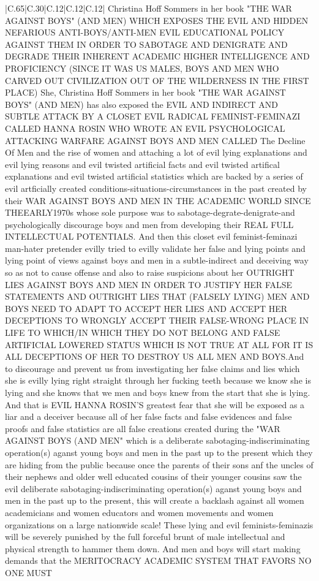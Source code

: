 \documentclass[11pt]{article}
\newlength\mylength
\begin{document}
\begin{center}
\begin{longtable}{|C{.65\mylength}|C{.30\mylength}|C{.12\mylength}|C{.12\mylength}|C{.12\mylength}|}
Christina Hoff Sommers in her book "THE WAR AGAINST BOYS" (AND MEN) WHICH EXPOSES THE EVIL AND HIDDEN NEFARIOUS ANTI-BOYS/ANTI-MEN EVIL EDUCATIONAL POLICY AGAINST THEM IN ORDER TO SABOTAGE AND DENIGRATE AND DEGRADE THEIR INHERENT ACADEMIC HIGHER INTELLIGENCE AND PROFICIENCY (SINCE IT WAS US MALES, BOYS AND MEN WHO CARVED OUT CIVILIZATION OUT OF THE WILDERNESS IN THE FIRST PLACE) She, Christina Hoff Sommers in her book "THE WAR AGAINST BOYS" (AND MEN) has also exposed the EVIL AND INDIRECT AND SUBTLE ATTACK BY A CLOSET EVIL RADICAL FEMINIST-FEMINAZI CALLED HANNA ROSIN WHO WROTE AN EVIL PSYCHOLOGICAL ATTACKING WARFARE AGAINST BOYS AND MEN CALLED The Decline Of Men and the rise of women and attaching a lot of evil lying explanations and evil lying reasons and evil twisted artificial facts and evil twisted artifical explanations and evil twisted artificial statistics which are backed by a series of evil artficially created conditions-situations-circumstances in the past created by their WAR AGAINST BOYS AND MEN IN THE ACADEMIC WORLD SINCE THEEARLY1970s whose sole purpose was to sabotage-degrate-denigrate-and psychologically discourage boys and men from developing their REAL FULL INTELLECTUAL POTENTIALS. And then this closet evil feminist-feminazi man-hater pretender evilly tried to evilly validate her false and lying points and lying point of views against boys and men in a subtle-indirect and deceiving way so as not to cause offense and also to raise suspicions about her OUTRIGHT LIES AGAINST BOYS AND MEN IN ORDER TO JUSTIFY HER FALSE STATEMENTS AND OUTRIGHT LIES THAT (FALSELY LYING) MEN AND BOYS NEED TO ADAPT TO ACCEPT HER LIES AND ACCEPT HER DECEPTIONS TO WRONGLY ACCEPT  THEIR FALSE-WRONG PLACE IN LIFE TO WHICH/IN WHICH THEY DO NOT BELONG AND FALSE ARTIFICIAL LOWERED STATUS WHICH IS NOT TRUE AT ALL FOR IT IS ALL DECEPTIONS OF HER TO DESTROY US ALL MEN AND BOYS.And to discourage and prevent us from investigating her false claims and lies which she is evilly lying right straight through her fucking teeth because we know she is lying and she knows that we men and boys knew from the start that she is lying. And that is EVIL HANNA ROSIN'S  greatest fear that she will be exposed as a liar and a deceiver because all of her false facts and false evidences and false proofs and false statistics are all false creations created during the "WAR AGAINST BOYS (AND MEN" which is a deliberate sabotaging-indiscriminating operation(s) aganst young boys and men in the past up to the present which they are hiding from the public because once the parents of their sons anf the uncles of their nephews and older well educated cousins of their younger cousins saw the evil deliberate sabotaging-indiscriminating operation(s) aganst young boys and men in the past up to the present, this will create a backlash against all women academicians and women educators and women movements and women organizations on a large nationwide scale! These lying and evil feminists-feminazis will be severely punished by the full forceful brunt of male intellectual and physical strength to hammer them down. And men and boys will start making demands that the MERITOCRACY ACADEMIC SYSTEM THAT FAVORS NO ONE  MUST 
\end{longtable}
\end{center}
\end{document}
